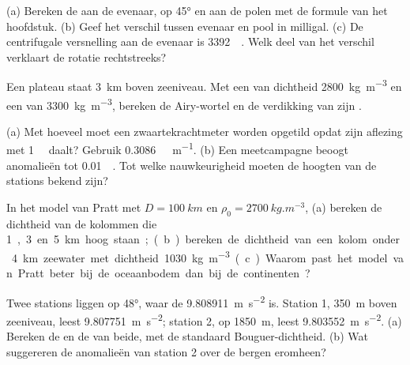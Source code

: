 \begin{exercise}[$\star$]\label{exo:b1:isostasy-gravity:2}
(a) Bereken de  aan de evenaar, op \ang{45} en aan de polen met de formule van het hoofdstuk. (b) Geef het verschil tussen evenaar en pool in milligal. (c) De centrifugale versnelling aan de evenaar is \qty{3392}{\milli\gal}. Welk deel van het verschil verklaart de rotatie rechtstreeks?
\end{exercise}

\begin{exercise}[$\star$]\label{exo:b1:isostasy-gravity:3}
Een plateau staat \qty{3}{km} boven zeeniveau. Met een  van dichtheid \qty{2800}{kg.m^{-3}} en een  van \qty{3300}{kg.m^{-3}}, bereken de Airy-wortel en de verdikking van zijn .
\end{exercise}

\begin{exercise}[$\star$]\label{exo:b1:isostasy-gravity:4}
(a) Met hoeveel moet een zwaartekrachtmeter worden opgetild opdat zijn aflezing met \qty{1}{\milli\gal} daalt? Gebruik \qty{0.3086}{\milli\gal.m^{-1}}. (b) Een meetcampagne beoogt anomalieën tot \qty{0.01}{\milli\gal}. Tot welke nauwkeurigheid moeten de hoogten van de stations bekend zijn?
\end{exercise}

\begin{exercise}[$\star\star$]\label{exo:b1:isostasy-gravity:5}
In het model van Pratt met $D = \qty{100}{km}$ en $\rho_0 = \qty{2700}{kg.m^{-3}}$,
(a) bereken de dichtheid van de kolommen die \qty{1}, \qty{3} en \qty{5}{km} hoog staan;
(b) bereken de dichtheid van een kolom onder \qty{4}{km} zeewater met dichtheid \qty{1030}{kg.m^{-3}}. (c) Waarom past het model van Pratt beter bij de oceaanbodem dan bij de continenten?
\end{exercise}

\begin{exercise}[$\star\star$]\label{exo:b1:isostasy-gravity:6}
Twee stations liggen op  \ang{48}, waar de  \qty{9.808911}{m.s^{-2}} is. Station 1, \qty{350}{m} boven zeeniveau, leest \qty{9.807751}{m.s^{-2}}; station 2, op \qty{1850}{m}, leest \qty{9.803552}{m.s^{-2}}. (a) Bereken de  en de  van beide, met de standaard Bouguer-dichtheid. (b) Wat suggereren de anomalieën van station 2 over de bergen eromheen?
\end{exercise}

